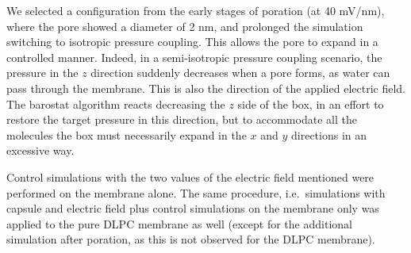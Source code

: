 We selected a configuration from the early stages of poration (at 40 mV/nm), where the pore showed a diameter of 2 nm, and prolonged the simulation switching to isotropic pressure coupling. This allows the pore to expand in a controlled manner. Indeed, in a semi-isotropic pressure coupling scenario, the pressure in the $z$ direction suddenly decreases when a pore forms, as water can pass through the membrane. This is also the direction of the applied electric field. The barostat algorithm reacts decreasing the $z$ side of the box, in an effort to restore the target pressure in this direction, but to accommodate all the molecules the box must necessarily expand in the $x$ and $y$ directions in an excessive way.

Control simulations with the two values of the electric field mentioned were performed on the membrane alone. The same procedure, i.e.\ simulations with capsule and electric field plus control simulations on the membrane only was applied to the pure DLPC membrane as well (except for the additional simulation after poration, as this is not observed for the DLPC membrane).


